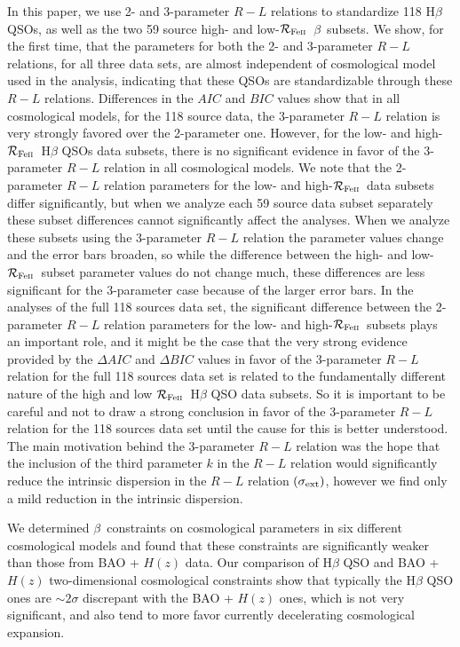 \documentclass[a4paper,fleqn,usenatbib]{mnras}
\newcommand{\rfe}{${\cal R}_{\rm{Fe\textsc{ii}}}$}
\newcommand{\hb}{{\sc{H}}$\beta$\/}
\begin{document}
In this paper, we use 2- and 3-parameter $R-L$ relations to standardize 118 H$\beta$ QSOs, as well as the two 59 source high- and low-\rfe\ \hb\ subsets. We show, for the first time, that the parameters for both the 2- and 3-parameter $R-L$ relations, for all three data sets, are almost independent of cosmological model used in the analysis, indicating that these QSOs are standardizable through these $R-L$ relations. Differences in the $AIC$ and $BIC$ values show that in all cosmological models, for the 118 source data, the 3-parameter $R-L$ relation is very strongly favored over the 2-parameter one. However, for the low- and high-\rfe\ H$\beta$ QSOs data subsets, there is no significant evidence in favor of the 3-parameter $R-L$ relation in all cosmological models. We note that the 2-parameter $R-L$ relation parameters for the low- and high-\rfe\ data subsets differ significantly, but when we analyze each 59 source data subset separately these subset differences cannot significantly affect the analyses. When we analyze these subsets using the 3-parameter $R-L$ relation the parameter values change and the error bars broaden, so while the difference between the high- and low-\rfe\ subset parameter values do not change much, these differences are less significant for the 3-parameter case because of the larger error bars. In the analyses of the full 118 sources data set, the significant difference between the 2-parameter $R-L$ relation parameters for the low- and high-\rfe\ subsets plays an 
important role, and it might be the case that the very strong evidence provided by the $\Delta AIC$ and $\Delta BIC$ values in favor of the 3-parameter $R-L$ relation for the full 118 sources data set is related to the fundamentally different nature of the high and low \rfe\ H$\beta$ QSO data subsets. So it is important to be careful and not to draw a strong conclusion in favor of the 3-parameter $R-L$ relation for the 118 sources data set until the cause for this is better understood. The main motivation behind the 3-parameter $R-L$ relation was the hope that the inclusion of the third parameter $k$ in the $R-L$ relation would significantly reduce the intrinsic dispersion in the $R-L$ relation $(\sigma_{\rm ext})$, however we find only a mild reduction in the intrinsic dispersion.

We determined \hb\ constraints on cosmological parameters in six different cosmological models and found that these constraints are significantly weaker than those from BAO + $H(z)$ data. Our comparison of H$\beta$ QSO and BAO + $H(z)$ two-dimensional cosmological constraints show that typically the H$\beta$ QSO ones are $\sim 2\sigma$ discrepant with the BAO + $H(z)$ ones, which is not very significant, and also tend to more favor currently decelerating cosmological expansion.
\end{document}
